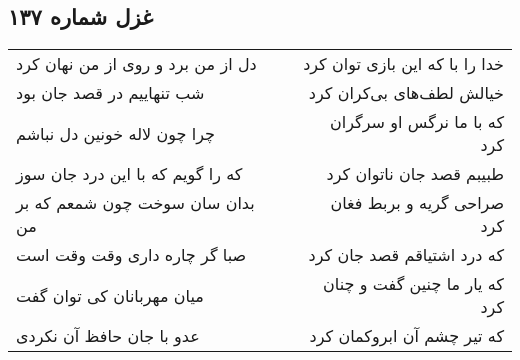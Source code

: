 \begin{center}
\section*{غزل شماره ۱۳۷}
\label{sec:sh137}
\begin{longtable}{l p{0.5cm} r}
دل از من برد و روی از من نهان کرد
&&
خدا را با که این بازی توان کرد
\\
شب تنهاییم در قصد جان بود
&&
خیالش لطف‌های بی‌کران کرد
\\
چرا چون لاله خونین دل نباشم
&&
که با ما نرگس او سرگران کرد
\\
که را گویم که با این درد جان سوز
&&
طبیبم قصد جان ناتوان کرد
\\
بدان سان سوخت چون شمعم که بر من
&&
صراحی گریه و بربط فغان کرد
\\
صبا گر چاره داری وقت وقت است
&&
که درد اشتیاقم قصد جان کرد
\\
میان مهربانان کی توان گفت
&&
که یار ما چنین گفت و چنان کرد
\\
عدو با جان حافظ آن نکردی
&&
که تیر چشم آن ابروکمان کرد
\\
\end{longtable}
\end{center}
